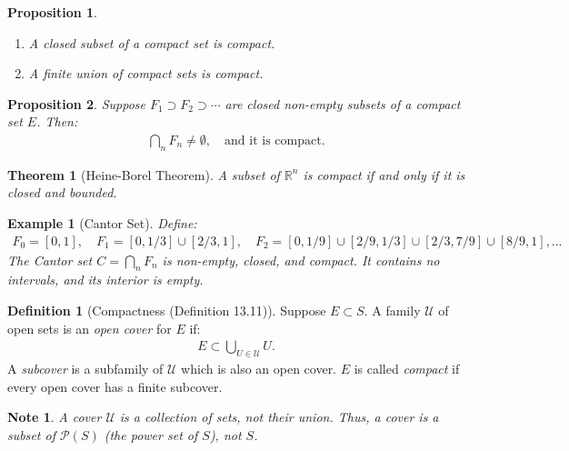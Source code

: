 \documentclass[7pt]{article}
\theoremstyle{definition}
\newtheorem{definition}{Definition}
\theoremstyle{plain}
\newtheorem{theorem}{Theorem}
\newtheorem{proposition}{Proposition}
\newtheorem{example}{Example}
\newtheorem{note}{Note}
\begin{document}
\begin{proposition}

\begin{enumerate}
    \item A closed subset of a compact set is compact.
    \item A finite union of compact sets is compact.
\end{enumerate}
\end{proposition}

\begin{proposition}
Suppose $ F_1 \supset F_2 \supset \cdots $ are closed non-empty subsets of a compact set $ E $. Then:
\begin{align}
\bigcap_{n} F_n \neq \emptyset, \quad \text{and it is compact.}
\end{align}
\end{proposition}

\begin{theorem}[Heine-Borel Theorem]
A subset of $ \mathbb{R}^n $ is compact if and only if it is closed and bounded.
\end{theorem}

\begin{example}[Cantor Set]
Define:
\begin{align}
F_0 = [0, 1], \quad F_1 = [0, 1/3] \cup [2/3, 1], \quad F_2 = [0, 1/9] \cup [2/9, 1/3] \cup [2/3, 7/9] \cup [8/9, 1], \dots
\end{align}
The Cantor set $ C = \bigcap_n F_n $ is non-empty, closed, and compact. It contains no intervals, and its interior is empty.
\end{example}

\begin{definition}[Compactness (Definition 13.11)]
Suppose $ E \subset S $. A family $ \mathcal{U} $ of open sets is an \emph{open cover} for $ E $ if:
\begin{align}
E \subset \bigcup_{U \in \mathcal{U}} U.
\end{align}
A \emph{subcover} is a subfamily of $ \mathcal{U} $ which is also an open cover. $ E $ is called \emph{compact} if every open cover has a finite subcover.
\end{definition}

\begin{note}
A cover $ \mathcal{U} $ is a collection of sets, not their union. Thus, a cover is a subset of $ \mathcal{P}(S) $ (the power set of $ S $), not $ S $.
\end{note}
\end{document}
